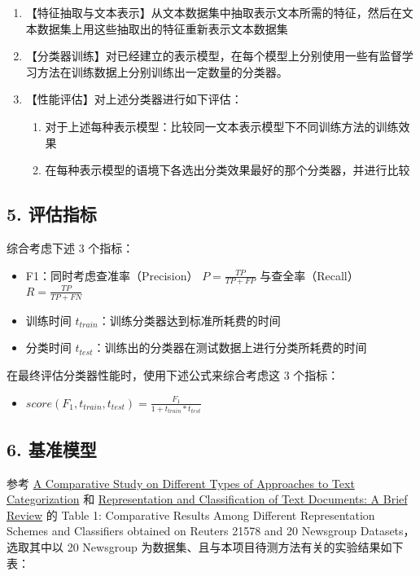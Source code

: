 \documentclass[11pt]{article}
\providecommand{\tightlist}{%
      \setlength{\itemsep}{0pt}\setlength{\parskip}{0pt}}
\begin{document}
\begin{enumerate}
\def\labelenumi{\arabic{enumi}.}
\tightlist
\item
  【特征抽取与文本表示】从文本数据集中抽取表示文本所需的特征，然后在文本数据集上用这些抽取出的特征重新表示文本数据集
\item
  【分类器训练】对已经建立的表示模型，在每个模型上分别使用一些有监督学习方法在训练数据上分别训练出一定数量的分类器。
\item
  【性能评估】对上述分类器进行如下评估：

  \begin{enumerate}
  \def\labelenumii{\arabic{enumii}.}
  \tightlist
  \item
    对于上述每种表示模型：比较同一文本表示模型下不同训练方法的训练效果
  \item
    在每种表示模型的语境下各选出分类效果最好的那个分类器，并进行比较
  \end{enumerate}
\end{enumerate}

    \subsection{5. 评估指标}\label{ux8bc4ux4f30ux6307ux6807}

综合考虑下述 3 个指标：

\begin{itemize}
\tightlist
\item
  F1：同时考虑查准率（Precision） \(P = \frac{TP}{TP + FP}\)
  与查全率（Recall） \(R = \frac{TP}{TP + FN}\)
\item
  训练时间 \(t_{train}\)：训练分类器达到标准所耗费的时间
\item
  分类时间 \(t_{test}\)：训练出的分类器在测试数据上进行分类所耗费的时间
\end{itemize}

在最终评估分类器性能时，使用下述公式来综合考虑这 3 个指标：

\begin{itemize}
\tightlist
\item
  \(score(F_{1}, t_{train}, t_{test}) = \frac{F_1}{1 + t_{train} * t_{test}}\)
\end{itemize}

    \subsection{6. 基准模型}\label{ux57faux51c6ux6a21ux578b}

参考 \href{http://www.ijmlc.org/papers/158-C01020-R001.pdf}{A
Comparative Study on Different Types of Approaches to Text
Categorization} 和
\href{https://pdfs.semanticscholar.org/5466/da15feb8e87724576683647fdda66a27195a.pdf}{Representation
and Classification of Text Documents: A Brief Review} 的 Table 1:
Comparative Results Among Different Representation Schemes and
Classifiers obtained on Reuters 21578 and 20 Newsgroup
Datasets，选取其中以 20 Newsgroup
为数据集、且与本项目待测方法有关的实验结果如下表：
\end{document}
